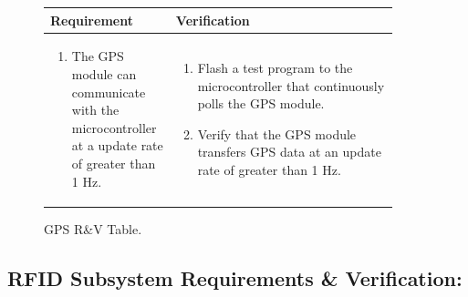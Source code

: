 \documentclass{article}
\begin{document}
\begin{figure}[H]
	\begin{center}
		\begin{tabular}{|p{0.3 \linewidth}|p{0.6 \linewidth}|}
			\hline
			Requirement & Verification  \\
			\hline
			\begin{enumerate}
				\item   The GPS module can communicate with the microcontroller at a update rate of greater than 1 Hz.  
			\end{enumerate} &
			\begin{enumerate}
				\item  Flash a test program to the microcontroller that continuously polls the GPS module.
				\item Verify that the GPS module transfers GPS data at an update rate of greater than 1 Hz.
			\end{enumerate}  \\
			\hline 
		\end{tabular}
	\end{center}
	\caption{GPS R\&V Table.}
\end{figure}

\subsection{RFID Subsystem Requirements \& Verification:}
\end{document}
